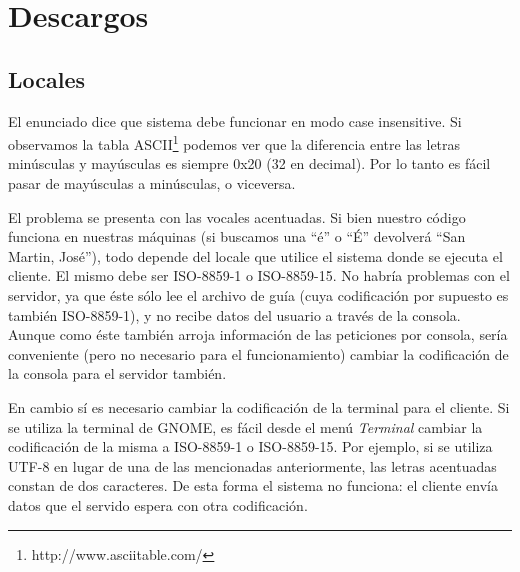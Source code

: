 \section{Descargos\label{sec:descargos}}

\subsection{Locales}
El enunciado dice que sistema debe funcionar en modo case insensitive. Si
observamos la tabla ASCII\footnote{http://www.asciitable.com/} podemos ver que
la diferencia entre las letras minúsculas y mayúsculas es siempre 0x20 (32 en
decimal). Por lo tanto es fácil pasar de mayúsculas a minúsculas, o viceversa.

El problema se presenta con las vocales acentuadas. Si bien nuestro código
funciona en nuestras máquinas (si buscamos una ``é'' o ``É'' devolverá ``San
Martin, José''), todo depende del locale que utilice el sistema donde se
ejecuta el cliente. El mismo debe ser ISO-8859-1 o ISO-8859-15. No habría
problemas con el servidor, ya que éste sólo lee el archivo de guía (cuya
codificación por supuesto es también ISO-8859-1), y no recibe datos del usuario
a través de la consola. Aunque como éste también arroja información de las
peticiones por consola, sería conveniente (pero no necesario para el
funcionamiento) cambiar la codificación de la consola para el servidor también.

En cambio sí es necesario cambiar la codificación de la terminal para el
cliente.  Si se utiliza la terminal de GNOME, es fácil desde el menú
\emph{Terminal} cambiar la codificación de la misma a ISO-8859-1 o ISO-8859-15.
Por ejemplo, si se utiliza UTF-8 en lugar de una de las mencionadas
anteriormente, las letras acentuadas constan de dos caracteres. De esta forma
el sistema no funciona: el cliente envía datos que el servido espera con otra
codificación.

